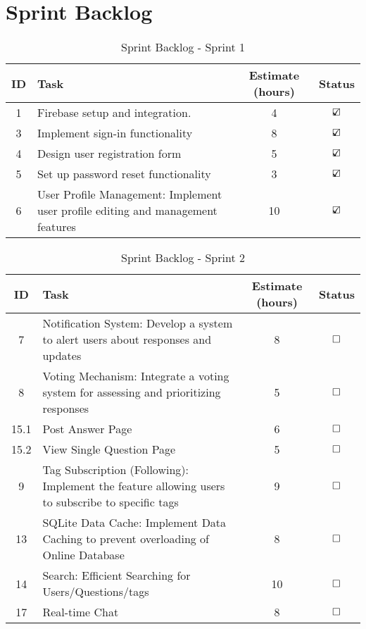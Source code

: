 \section{Sprint Backlog}\label{sprint_backlog}

\begin{table}[H]
    \centering
    \caption*{Sprint Backlog - Sprint 1}
    \begin{tabular}{|c|p{5cm}|c|c|}
        \hline
        \textbf{ID} & \textbf{Task} & \textbf{Estimate (hours)} & \textbf{Status} \\
        \hline
        1 & Firebase setup and integration. & 4 & $\text{\rlap{$\checkmark$}}\square$\\
        \hline
        3 & Implement sign-in functionality & 8 & $\text{\rlap{$\checkmark$}}\square$\\
        \hline
        4 & Design user registration form & 5 & $\text{\rlap{$\checkmark$}}\square$\\
        \hline
        5 & Set up password reset functionality & 3 & $\text{\rlap{$\checkmark$}}\square$\\
        \hline
        6 & User Profile Management: Implement user profile editing and management features & 10 & $\text{\rlap{$\checkmark$}}\square$\\
        \hline
    \end{tabular}
\end{table}


\begin{table}[H]
    \centering
    \caption*{Sprint Backlog - Sprint 2}
    \begin{tabular}{|c|p{5cm}|c|c|}
        \hline
        \textbf{ID} & \textbf{Task} & \textbf{Estimate (hours)} & \textbf{Status} \\
        \hline
        7 & Notification System: Develop a system to alert users about responses and updates & 8 & $\text{\rlap{}}\square$\\
        \hline
        8 & Voting Mechanism: Integrate a voting system for assessing and prioritizing responses & 5 & $\text{\rlap{}}\square$\\
        \hline
        15.1 & Post Answer Page & 6 & $\text{\rlap{}}\square$\\
        \hline
        15.2 & View Single Question Page & 5 & $\text{\rlap{}}\square$\\
        \hline
        9 & Tag Subscription (Following): Implement the feature allowing users to subscribe to specific tags & 9 & $\text{\rlap{}}\square$\\
        \hline
        13 & SQLite Data Cache: Implement Data Caching to prevent overloading of Online Database & 8 & $\text{\rlap{}}\square$\\
        \hline
        14 & Search: Efficient Searching for Users/Questions/tags & 10 & $\text{\rlap{}}\square$\\
        \hline
        17 & Real-time Chat & 8 & $\text{\rlap{}}\square$\\
        \hline
    \end{tabular}
\end{table}

